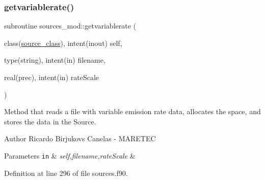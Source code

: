 \subsubsection{\texorpdfstring{getvariablerate()}{getvariablerate()}}
{\footnotesize\ttfamily subroutine sources\+\_\+mod\+::getvariablerate (\begin{DoxyParamCaption}\item[{class(\mbox{\hyperlink{structsources__mod_1_1source__class}{source\+\_\+class}}), intent(inout)}]{self,  }\item[{type(string), intent(in)}]{filename,  }\item[{real(prec), intent(in)}]{rate\+Scale }\end{DoxyParamCaption})\hspace{0.3cm}{\ttfamily [private]}}



Method that reads a file with variable emission rate data, allocates the space, and stores the data in the Source. 

\begin{DoxyAuthor}{Author}
Ricardo Birjukovs Canelas -\/ M\+A\+R\+E\+T\+EC 
\end{DoxyAuthor}

\begin{DoxyParams}[1]{Parameters}
\mbox{\tt in}  & {\em self,filename,rate\+Scale} & \\
\hline
\end{DoxyParams}


Definition at line 296 of file sources.\+f90.


